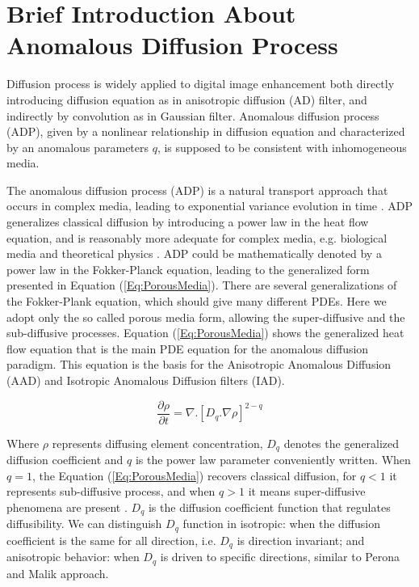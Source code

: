 \documentclass{InsightArticle}
\newcommand{\IJhandlerIDnumber}{3565}
\begin{document}
\IJhandlenote{\IJhandlerIDnumber}

\tableofcontents

\section{Brief Introduction About Anomalous Diffusion Process}

Diffusion process is widely applied to digital image enhancement both directly introducing diffusion equation as in anisotropic diffusion (AD) filter, and indirectly by convolution as in Gaussian filter. Anomalous diffusion process (ADP), given by a nonlinear relationship in diffusion equation and characterized by an anomalous parameters $q$, is supposed to be consistent with inhomogeneous media. 

The anomalous diffusion process (ADP) is a natural transport approach that occurs in complex media, leading to exponential variance evolution in time \cite{Tsallis2009Livro}. ADP generalizes classical diffusion by introducing a power law in the heat flow equation, and is reasonably more adequate for complex media, e.g. biological media \cite{Hagmann2006} and theoretical physics \cite{Lenzi2003}. ADP could be mathematically denoted by a power law in the Fokker-Planck equation, leading to the generalized form presented in Equation (\ref{Eq:PorousMedia}). There are several generalizations of the Fokker-Plank equation, which should give many different PDEs. Here we adopt only the so called porous media form, allowing the super-diffusive and the sub-diffusive processes. Equation (\ref{Eq:PorousMedia}) shows the generalized heat flow equation that is the main PDE equation for the anomalous diffusion paradigm. This equation is the basis for the Anisotropic Anomalous Diffusion (AAD) and Isotropic Anomalous Diffusion filters (IAD).

\begin{equation}\label{Eq:PorousMedia}
 \frac{\partial \rho}{\partial t} = \nabla.[D_{q}.\nabla \rho]^{2-q}
\end{equation}

Where $\rho$ represents diffusing element concentration, $D_{q}$ denotes the generalized diffusion coefficient and $q$ is the power law parameter conveniently written. When $q = 1$, the Equation (\ref{Eq:PorousMedia}) recovers classical diffusion, for $q < 1$ it represents sub-diffusive process, and when $q > 1$ it means super-diffusive phenomena are present \cite{Tsallis2009Livro,Schwammle2008}. $D_{q}$ is the diffusion coefficient function that regulates diffusibility. We can distinguish $D_{q}$ function in isotropic: when the diffusion coefficient is the same for all direction, i.e. $D_{q}$ is direction invariant; and anisotropic behavior: when $D_{q}$ is driven to specific directions, similar to Perona and Malik approach.
\end{document}
